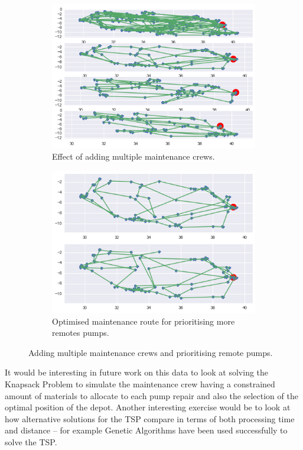 \documentclass{article} %
\begin{document}
\begin{multicols}{2}
\begin{figure}
	\begin{subfigure}{0.5\textwidth}
		\includegraphics[width=\textwidth]{figures/Multiple-salesmen}
		\caption{Effect of adding multiple maintenance crews.}
		\label{fig:Multiple-crews}
	\end{subfigure}
	\begin{subfigure}{0.5\textwidth}
		\includegraphics[width=\textwidth]{figures/Prioritising-remote-pumps}
		\caption{Optimised maintenance route for prioritising more remotes pumps.}
		\label{fig:Priority-remote}
	\end{subfigure}
	\caption{Adding multiple maintenance crews and prioritising remote pumps.}
	\label{fig:Modifications}
\end{figure}

It would be interesting in future work on this data to look at solving the Knapsack Problem to simulate the maintenance crew having a constrained amount of materials to allocate to each pump repair and also the selection of the optimal position of the depot. Another interesting exercise would be to look at how alternative solutions for the TSP compare in terms of both processing time and distance -- for example Genetic Algorithms have been used successfully to solve the TSP.


\end{multicols}
\end{document}
